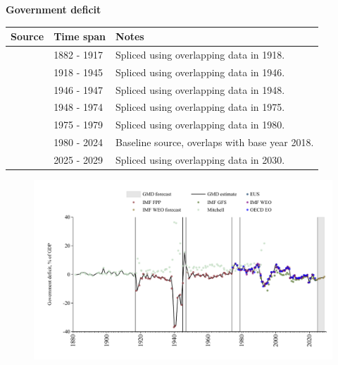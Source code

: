 \documentclass[12pt,a4paper,landscape]{article}
\begin{document}
\begin{adjustbox}{max totalsize={\paperwidth}{\paperheight},center}
\begin{minipage}[t][\textheight][t]{\textwidth}
\vspace*{0.5cm}
{}
\begin{center}
{\Large\bfseries Government deficit}
\end{center}
\vspace{0.5cm}
\begin{table}[H]
\centering
\small
\begin{tabular}{|l|l|l|}
\hline
\textbf{Source} & \textbf{Time span} & \textbf{Notes} \\
\hline
\rowcolor{white}\cite{Mitchell}& 1882 - 1917 &Spliced using overlapping data in 1918. \\
\rowcolor{lightgray}\cite{IMF_FPP}& 1918 - 1945 &Spliced using overlapping data in 1946. \\
\rowcolor{white}\cite{Mitchell}& 1946 - 1947 &Spliced using overlapping data in 1948. \\
\rowcolor{lightgray}\cite{IMF_FPP}& 1948 - 1974 &Spliced using overlapping data in 1975. \\
\rowcolor{white}\cite{OECD_EO}& 1975 - 1979 &Spliced using overlapping data in 1980. \\
\rowcolor{lightgray}\cite{EUS}& 1980 - 2024 &Baseline source, overlaps with base year 2018. \\
\rowcolor{white}\cite{IMF_WEO_forecast}& 2025 - 2029 &Spliced using overlapping data in 2030. \\
\hline
\end{tabular}
\end{table}
\begin{figure}[H]
\centering
\includegraphics[width=\textwidth,height=0.6\textheight,keepaspectratio]{graphs/FIN_govdef_GDP.pdf}
\end{figure}
\end{minipage}
\end{adjustbox}
\end{document}
